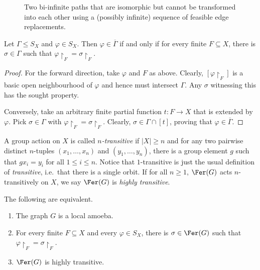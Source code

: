 \begin{figure}[ht]
    \centering
    
    \caption{Two bi-infinite paths that are isomorphic but cannot be transformed into each other using a (possibly infinite) sequence of feasible edge replacements.}
    \label{fig:infinite_paths}
\end{figure}

\begin{lemma}\label{lemma:closure_finite_witness}
    Let $\Gamma\leq S_X$ and $\varphi\in S_X$.
    Then $\varphi\in\overline{\Gamma}$ if and only if for every finite $F\subseteq X$, there is $\sigma\in\Gamma$ such that $\varphi\restriction_F=\sigma\restriction_F$.
\end{lemma}

\begin{proof}
    For the forward direction, take $\varphi$ and $F$ as above.
    Clearly, $[\varphi\restriction_F]$ is a basic open neighbourhood of $\varphi$ and hence must intersect $\Gamma$.
    Any $\sigma$ witnessing this has the sought property.

    Conversely, take an arbitrary finite partial function $t\colon F\to X$ that is extended by $\varphi$.
    Pick $\sigma\in\Gamma$ with $\varphi\restriction_F=\sigma\restriction_F$.
    Clearly, $\sigma\in\Gamma\cap[t]$, proving that $\varphi\in\overline{\Gamma}$.
\end{proof}

A group action on $X$ is called \emph{$n$-transitive} if $|X|\geq n$ and for any two pairwise distinct $n$-tuples $(x_1,\dots,x_n)$ and $(y_1,\dots,y_n)$, there is a group element $g$ such that $gx_i=y_i$ for all $1\leq i\leq n$.
Notice that $1$-transitive is just the usual definition of \emph{transitive}, i.e.\ that there is a single orbit.
If for all $n\geq1$, $\Fer(G)$ acts $n$-transitively on $X$, we say $\Fer(G)$ is \emph{highly transitive}.

\begin{proposition}\label{prop:char_local}
    The following are equivalent.
    \begin{enumerate}[label=(\arabic*)]
        \item The graph $G$ is a local amoeba.
        \item For every finite $F\subseteq X$ and every $\varphi\in S_X$, there is $\sigma\in\Fer(G)$ such that $\varphi\restriction_F=\sigma\restriction_F$.
        \item $\Fer(G)$ is highly transitive.
    \end{enumerate}
\end{proposition}


